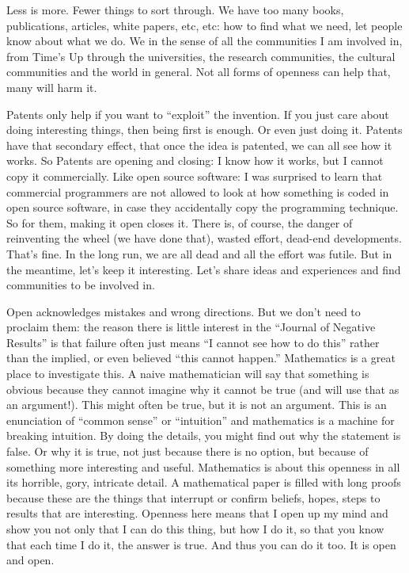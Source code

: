 Less is more. Fewer things to sort through. We have too many books,
publications, articles, white papers, etc, etc: how to find what we
need, let people know about what we do. We in the sense of all the
communities I am involved in, from Time's Up through the universities,
the research communities, the cultural communities and the world in
general. Not all forms of openness can help that, many will harm it.

Patents only help if you want to ``exploit'' the invention. If you just
care about doing interesting things, then being first is enough. Or even
just doing it. Patents have that secondary effect, that once the idea is
patented, we can all see how it works. So Patents are opening and
closing: I know how it works, but I cannot copy it commercially. Like
open source software: I was surprised to learn that commercial
programmers are not allowed to look at how something is coded in open
source software, in case they accidentally copy the programming
technique. So for them, making it open closes it. There is, of course,
the danger of reinventing the wheel (we have done that), wasted effort,
dead-end developments. That's fine. In the long run, we are all dead and
all the effort was futile. But in the meantime, let's keep it
interesting. Let's share ideas and experiences and find communities to
be involved in.

Open acknowledges mistakes and wrong directions. But we don't need to
proclaim them: the reason there is little interest in the ``Journal of
Negative Results'' is that failure often just means ``I cannot see how
to do this'' rather than the implied, or even believed ``this cannot
happen.'' Mathematics is a great place to investigate this. A naive
mathematician will say that something is obvious because they cannot
imagine why it cannot be true (and will use that as an argument!). This
might often be true, but it is not an argument. This is an enunciation
of ``common sense'' or ``intuition'' and mathematics is a machine for
breaking intuition. By doing the details, you might find out why the
statement is false. Or why it is true, not just because there is no
option, but because of something more interesting and useful.
Mathematics is about this openness in all its horrible, gory, intricate
detail. A mathematical paper is filled with long proofs because these
are the things that interrupt or confirm beliefs, hopes, steps to
results that are interesting. Openness here means that I open up my mind
and show you not only that I can do this thing, but how I do it, so that
you know that each time I do it, the answer is true. And thus you can do
it too. It is open and open.


